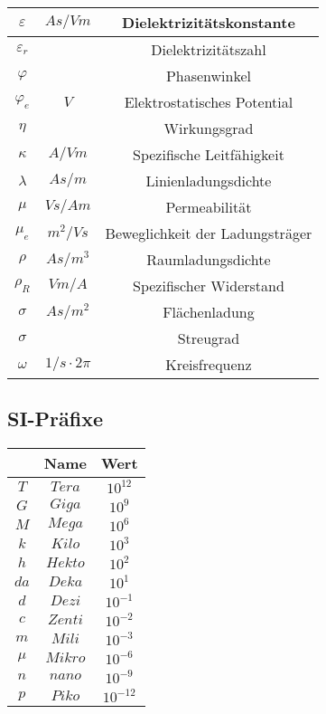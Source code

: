 \documentclass[a4paper, 11pt]{scrartcl}
\begin{document}
\begin{multicols*}{2}
\begin{center}
\begin{tabular}{|c|c|c|}
				\hline
				$\varepsilon$ & $As/Vm$ & Dielektrizitätskonstante \\
				\hline
				$\varepsilon_r$ & & Dielektrizitätszahl \\
				\hline			
				$\varphi$ &  & Phasenwinkel \\
				\hline
				$\varphi_e$ & $V$ & Elektrostatisches Potential \\
				\hline
				$\eta$ & & Wirkungsgrad \\
				\hline
				$\kappa$ & $A/Vm$ & Spezifische Leitfähigkeit \\
				\hline
				$\lambda$ & $As/m$ & Linienladungsdichte \\
				\hline
				$\mu$ & $Vs/Am$ & Permeabilität \\
				\hline
				$\mu_e$ & $m^2/Vs$ & Beweglichkeit der Ladungsträger \\
				\hline
				$\rho$ & $As/m^3$ & Raumladungsdichte \\
				\hline
				$\rho_R$ & $Vm/A$ & Spezifischer Widerstand \\
				\hline
				$\sigma$ & $As/m^2$ & Flächenladung \\
				\hline
				$\sigma$ & & Streugrad \\
				\hline
				$\omega$ & $1/s\cdot 2\pi$ & Kreisfrequenz \\
				\hline
				
				\end{tabular}
				
				 
				
				\end{center}
				\begin{center}
				\subsection{SI-Präfixe}
				\vspace{-0.1cm}
				\begin{tabular}{|c|c|c|}
				\hline
				\textbf{} & \textbf{Name} & \textbf{Wert} \\
				\hline
				$T$ & $Tera$ & $10^{12}$ \\
				\hline
				$G$ & $Giga$ & $10^{9}$ \\
				\hline
				$M$ & $Mega$ & $10^{6}$ \\
				\hline
				$k$ & $Kilo$ & $10^{3}$ \\
				\hline
				$h$ & $Hekto$ & $10^{2}$ \\
				\hline
				$da$ & $Deka$ & $10^{1}$ \\
				\hline
				$d$ & $Dezi$ & $10^{-1}$ \\
				\hline
				$c$ & $Zenti$ & $10^{-2}$ \\
				\hline
				$m$ & $Mili$ & $10^{-3}$ \\
				\hline
				$\mu$ & $Mikro$ & $10^{-6}$ \\
				\hline
				$n$ & $nano$ & $10^{-9}$ \\
				\hline
				$p$ & $Piko$ & $10^{-12}$ \\
				\hline
				\end{tabular}			
	 	\end{center}
												

\end{multicols*}
\end{document}
